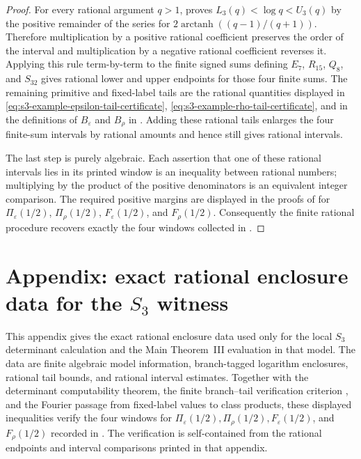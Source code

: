 \documentclass[11pt,a4paper]{amsart}
\theoremstyle{plain}
\theoremstyle{definition}
\theoremstyle{remark}
\begin{document}
\begin{proof}
  For every rational argument \(q>1\),
   proves
  \(L_3(q)<\log q<U_3(q)\) by the positive remainder of the series for
  \(2\operatorname{arctanh}((q-1)/(q+1))\).  Therefore multiplication by a
  positive rational coefficient preserves the order of the interval and
  multiplication by a negative rational coefficient reverses it.  Applying this
  rule term-by-term to the finite signed sums defining
  \(E_7\), \(R_{15}\), \(Q_8\), and \(S_{32}\) gives rational lower and upper
  endpoints for those four finite sums.  The remaining primitive and
  fixed-label tails are the rational quantities displayed in
  \eqref{eq:s3-example-epsilon-tail-certificate},
  \eqref{eq:s3-example-rho-tail-certificate}, and in the definitions of
  \(B_\varepsilon\) and \(B_\rho\) in
  .  Adding these rational tails
  enlarges the four finite-sum intervals by rational amounts and hence still
  gives rational intervals.

  The last step is purely algebraic.  Each assertion that one of these rational
  intervals lies in its printed window is an inequality between rational
  numbers; multiplying by the product of the positive denominators is an
  equivalent integer comparison.  The required positive margins are displayed in
  the proofs of
  for \(\Pi_\varepsilon(1/2)\), \(\Pi_\rho(1/2)\),
  \(F_\varepsilon(1/2)\), and \(F_\rho(1/2)\).  Consequently the finite rational
  procedure recovers exactly the four windows collected in
  .
\end{proof}
\section{Appendix: exact rational enclosure data for the \texorpdfstring{\(S_3\)}{S3} witness}
\label{app:fixed-label-local-certificates}

This appendix gives the exact rational enclosure data used only for the local
\(S_3\) determinant calculation and the Main Theorem~III evaluation in that
model.  The data are finite algebraic model information, branch-tagged
logarithm enclosures, rational tail bounds, and rational interval estimates.
Together with the determinant computability theorem, the finite branch--tail
verification criterion , and the
Fourier passage from fixed-label values to class products, these displayed
inequalities verify the four windows for
\(\Pi_\varepsilon(1/2),\Pi_\rho(1/2),F_\varepsilon(1/2)\), and
\(F_\rho(1/2)\) recorded in
.  The verification is
self-contained from the rational endpoints and interval comparisons printed in
that appendix.
\end{document}
